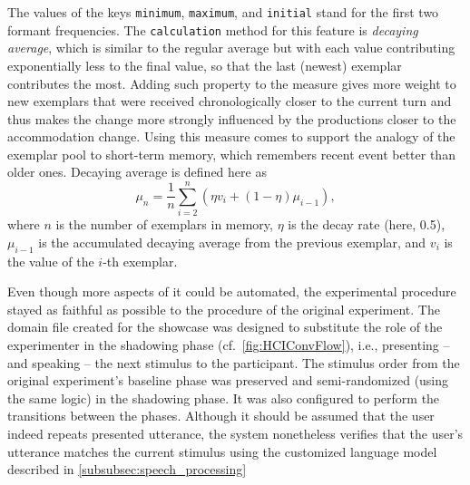 \noindent
The values of the keys \texttt{minimum}, \texttt{maximum}, and \texttt{initial} stand for the first two formant frequencies.
The \texttt{calculation} method for this feature is \emph{decaying average}, which is similar to the regular average but with each value contributing exponentially less to the final value, so that the last (newest) exemplar contributes the most.
Adding such property to the measure gives more weight to new exemplars that were received chronologically closer to the current turn and thus makes the change more strongly influenced by the productions closer to the accommodation change.
Using this measure comes to support the analogy of the exemplar pool to short-term memory, which remembers recent event better than older ones.
Decaying average is defined here as
%
\begin{equation} 
	\label{eq:decaying_average} 
	\mu_n = \frac{1}{n}\sum_{i = 2}^{n}(\eta v_i + (1 - \eta )\mu_{i-1}), 
\end{equation} 
%
\noindent
where $n$ is the number of exemplars in memory, $\eta$ is the decay rate (here, 0.5), $\mu_{i-1}$ is the accumulated decaying average from the previous exemplar, and $v_i$ is the value of the $i$-th exemplar. 

Even though more aspects of it could be automated, the experimental procedure stayed as faithful as possible to the procedure of the original experiment.
The domain file created for the showcase was designed to substitute the role of the experimenter in the shadowing phase (cf.\ \cref{fig:HCIConvFlow}), i.e., presenting -- and speaking -- the next stimulus to the participant.
The stimulus order from the original experiment's baseline phase was preserved and semi-randomized (using the same logic) in the shadowing phase.
It was also configured to perform the transitions between the phases.
Although it should be assumed that the user indeed repeats presented utterance, the system nonetheless verifies that the user's utterance matches the current stimulus using the customized language model described in \cref{subsubsec:speech_processing}


